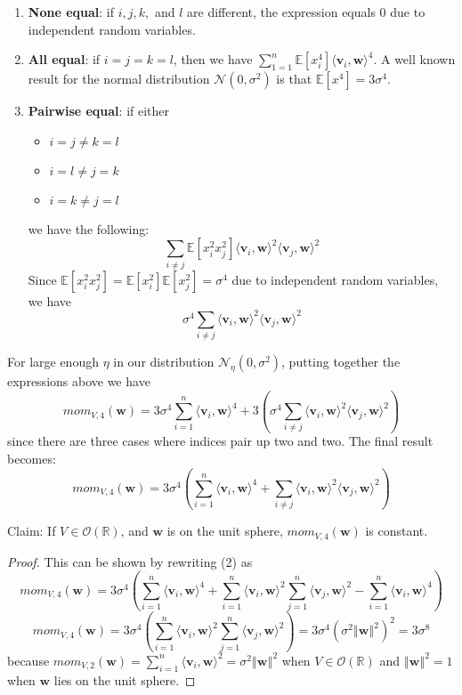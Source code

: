 \documentclass[12 pt]{article}        	%
\newcommand{\mat}[1]{\mathit{#1}}
\renewcommand{\vec}[1]{\mathbf{#1}}
\newcommand{\normdist}[2]{\mathcal{N}(#1, #2^2)}
\newcommand{\bb}[1]{\mathbb{#1}}
\begin{document}
\begin{enumerate}
    \item \textbf{None equal}: if $i, j, k,$ and $l$ are different, the expression equals 0 due to independent random variables.
    \item \textbf{All equal}: if $i = j = k = l$, then we have $\sum_{1=1}^{n} \bb{E}[x_i ^4] \langle \vec{v}_i, \vec{w} \rangle^4$. 
        A well known result for the normal distribution $\normdist{0}{\sigma}$ is that $\bb{E}[x^4] = 3 \sigma^4$.
    \item \textbf{Pairwise equal}: if either 
        \begin{itemize}
            \item $i=j \neq k=l$
            \item $i=l \neq j=k$
            \item $i=k \neq j=l$
        \end{itemize}
        we have the following:
        \[
            \sum_{i\neq j} \bb{E}[x_i^2x_j^2] \langle \vec{v}_i, \vec{w} \rangle ^2 \langle \vec{v}_j, \vec{w} \rangle^2
        \]
        Since $\bb{E}[x_i^2x_j^2] = \bb{E}[x_i^2]\bb{E}[x_j^2] = \sigma^4$ due to independent random variables, we have
        \[
            \sigma^4 \sum_{i\neq j} \langle \vec{v}_i, \vec{w} \rangle ^2 \langle \vec{v}_j, \vec{w} \rangle^2
        \]
\end{enumerate}
For large enough $\eta$ in our distribution $\mathcal{N}_{\eta}(0, \sigma^2)$, putting together the expressions above we have
\[mom_{\mat{V}, 4}(\vec{w}) = 3 \sigma^4 \sum_{i=1}^{n} \langle \vec{v}_i, \vec{w}\rangle^4 + 3(\sigma^4 \sum_{i \neq j} \langle \vec{v}_i, \vec{w}\rangle^2 \langle \vec{v}_j, \vec{w}\rangle^2)\] 
since there are three cases where indices pair up two and two. The final result becomes:
\begin{equation}
    mom_{\mat{V}, 4}(\vec{w}) = 3 \sigma^4 (\sum_{i=1}^{n} \langle \vec{v}_i, \vec{w}\rangle^4 + \sum_{i \neq j} \langle \vec{v}_i, \vec{w}\rangle^2 \langle \vec{v}_j, \vec{w}\rangle^2)
\end{equation}

Claim: If $\mat{V} \in \mathcal{O}(\bb{R})$, and $\vec{w}$ is on the unit sphere, $mom_{\mat{V}, 4}(\vec{w})$ is constant. 

\begin{proof}
This can be shown by rewriting (2) as  
\[ mom_{\mat{V}, 4}(\vec{w}) = 3\sigma^4(\sum_{i=1}^n \langle \vec{v}_i, \vec{w}\rangle^4 + \sum_{i=1}^n \langle \vec{v}_i, \vec{w} \rangle^2 \sum_{j=1}^n \langle \vec{v}_j, \vec{w}\rangle^2 - \sum_{i=1}^n\langle \vec{v}_i, \vec{w}\rangle^4 )\]
\[ mom_{\mat{V}, 4}(\vec{w}) = 3\sigma^4(\sum_{i=1}^n \langle \vec{v}_i, \vec{w}\rangle^2 \sum_{j=1}^n \langle \vec{v}_j, \vec{w}\rangle^2) = 3\sigma^4(\sigma^2\left \Vert \vec{w} \right \Vert^2)^2 = 3\sigma^8\]
because $mom_{\mat{V}, 2}(\vec{w}) = \sum_{i=1}^n \langle \vec{v}_i, \vec{w}\rangle^2 = \sigma^2 \left \Vert \vec{w} \right \Vert^2$ when $\mat{V} \in \mathcal{O}(\bb{R})$ and $\left \Vert \vec{w} \right \Vert^2 = 1$ when $\vec{w}$ lies on the unit sphere.
\end{proof}
\end{document}
